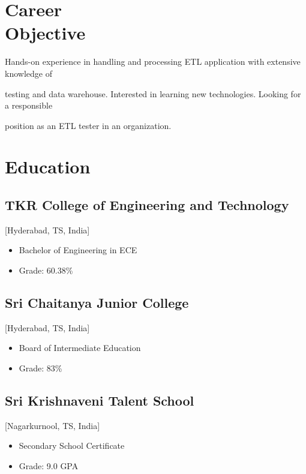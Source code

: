 \documentclass{mycv}
\begin{document}
\maketitle%
\section{Career \\ Objective}
\begin{description}
  \item Hands-on experience in handling and processing ETL application with extensive       
  knowledge of 
  \item testing and data warehouse. Interested in learning new technologies. Looking for a responsible 
  \item position as an ETL tester in an organization.
\end{description}

\section{Education}

\subsection{TKR College of Engineering and Technology}[Hyderabad, TS, India]
\vspace{-\parskip}%
\begin{itemize}[label={}]
  \item Bachelor of Engineering in ECE  
  \item Grade: 60.38\%
\end{itemize}
\vspace{-\parskip}%
\subsection{Sri Chaitanya Junior College}[Hyderabad, TS, India]
\vspace{-\parskip}%
\begin{itemize}[label={}]
  \item Board of Intermediate Education 
  \item Grade: 83\%
\end{itemize}
\vspace{-\parskip}%
\subsection{Sri Krishnaveni Talent School}[Nagarkurnool, TS, India]
\vspace{-\parskip}%
\begin{itemize}[label={}]
  \item Secondary School Certificate 
  \item Grade: 9.0 GPA
\end{itemize}
\end{document}
